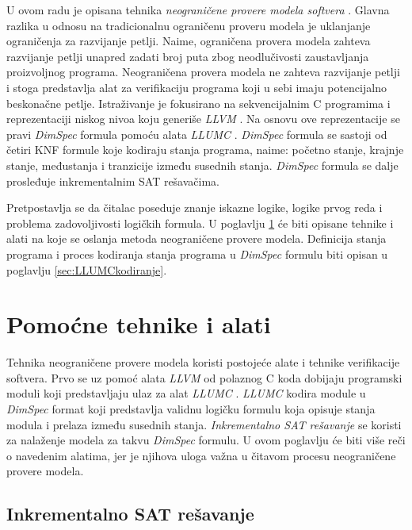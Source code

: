 \documentclass[a4paper]{article}
\theoremstyle{plain}
\theoremstyle{definition}
\begin{document}
U ovom radu je opisana tehnika \emph{neograničene provere modela softvera} \cite{ubsmc}. Glavna razlika u odnosu na tradicionalnu ograničenu proveru modela je uklanjanje ograničenja za razvijanje petlji. Naime, ograničena provera modela zahteva razvijanje petlji unapred zadati broj puta zbog neodlučivosti zaustavljanja proizvoljnog programa. Neograničena provera modela ne zahteva razvijanje petlji i stoga predstavlja alat za verifikaciju programa koji u sebi imaju potencijalno beskonačne petlje. Istraživanje je fokusirano na sekvencijalnim C programima i reprezentaciji niskog nivoa koju generiše \emph{LLVM} \cite{llvm}. Na osnovu ove reprezentacije se pravi \emph{DimSpec} formula pomoću alata \emph{LLUMC} \cite{llumc}. \emph{DimSpec} formula se sastoji od četiri KNF formule koje kodiraju stanja programa, naime: početno stanje, krajnje stanje, međustanja i tranzicije između susednih stanja. \emph{DimSpec} formula se dalje prosleđuje inkrementalnim SAT rešavačima.

Pretpostavlja se da čitalac poseduje znanje iskazne logike, logike prvog reda i problema zadovoljivosti logičkih formula. U poglavlju \ref{sec:PomocneTehnike} će biti opisane tehnike i alati na koje se oslanja metoda neograničene provere modela. Definicija stanja programa i proces kodiranja stanja programa u \emph{DimSpec} formulu biti opisan u poglavlju \ref{sec:LLUMCkodiranje}.


\section{Pomoćne tehnike i alati}
\label{sec:PomocneTehnike}

Tehnika neograničene provere modela koristi postojeće alate i tehnike verifikacije softvera. Prvo se uz pomoć alata \emph{LLVM} \cite{llvm} od polaznog C koda dobijaju programski moduli koji predstavljaju ulaz za alat \emph{LLUMC} \cite{llumc}. \emph{LLUMC} kodira module u \emph{DimSpec} format koji predstavlja validnu logičku formulu koja opisuje stanja modula i prelaza između susednih stanja. \emph{Inkrementalno SAT rešavanje} \cite{iss} se koristi za nalaženje modela za takvu \emph{DimSpec} formulu. U ovom poglavlju će biti više reči o navedenim alatima, jer je njihova uloga važna u čitavom procesu neograničene provere modela.

\subsection{Inkrementalno SAT rešavanje}
\label{subsec:ISS}
\end{document}
